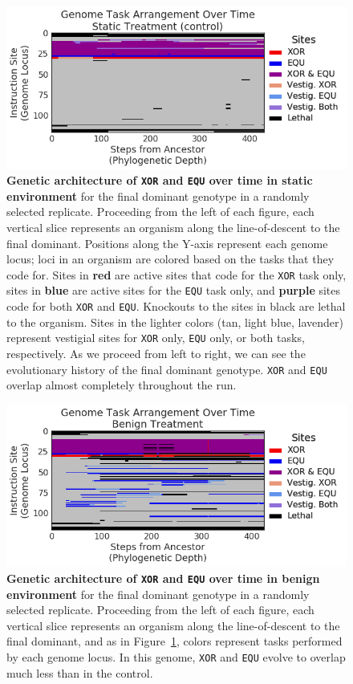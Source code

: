 \documentclass[10pt,letterpaper]{article}
\begin{document}
	\begin{figure}[!h]
	\includegraphics[width=0.75\columnwidth]{figures/CE/control__whole_taskmap.png}
	\caption{\textbf{Genetic architecture of \texttt{XOR} and \texttt{EQU} over time in static environment} for the final dominant genotype in a randomly selected replicate. Proceeding from the left of each figure, each vertical slice represents an organism along the line-of-descent to the final dominant.
	Positions along the Y-axis represent each genome locus; loci in an organism are colored based on the tasks that they code for. Sites in \textbf{red} are active sites that code for the \texttt{XOR} task only, sites in \textbf{blue} are active sites for the \texttt{EQU} task only, and \textbf{purple} sites code for both \texttt{XOR} and \texttt{EQU}. Knockouts to the sites in black are lethal to the organism. Sites in the lighter colors (tan, light blue, lavender) represent vestigial sites for \texttt{XOR} only, \texttt{EQU} only, or both tasks, respectively. As we proceed from left to right, we can see the evolutionary history of the final dominant genotype. \texttt{XOR} and \texttt{EQU} overlap almost completely throughout the run.}
	\label{fig:lineage-control}
	\end{figure}

	\begin{figure}[!h]
	\includegraphics[width=0.75\columnwidth]{figures/CE/benign__whole_taskmap.png}
	\caption{\textbf{Genetic architecture of \texttt{XOR} and \texttt{EQU} over time in benign environment} for the final dominant genotype in a randomly selected replicate. Proceeding from the left of each figure, each vertical slice represents an organism along the line-of-descent to the final dominant, and as in Figure~\ref{fig:lineage-control}, colors represent tasks performed by each genome locus. In this genome, \texttt{XOR} and \texttt{EQU} evolve to overlap much less than in the control.}
	\label{fig:lineage-benign}
	\end{figure}
\end{document}
